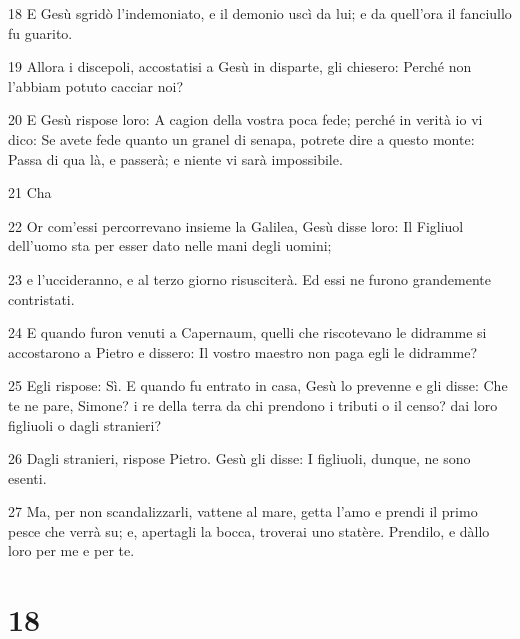 \par 18 E Gesù sgridò l'indemoniato, e il demonio uscì da lui; e da quell'ora il fanciullo fu guarito.
\par 19 Allora i discepoli, accostatisi a Gesù in disparte, gli chiesero: Perché non l'abbiam potuto cacciar noi?
\par 20 E Gesù rispose loro: A cagion della vostra poca fede; perché in verità io vi dico: Se avete fede quanto un granel di senapa, potrete dire a questo monte: Passa di qua là, e passerà; e niente vi sarà impossibile.
\par 21 Cha
\par 22 Or com'essi percorrevano insieme la Galilea, Gesù disse loro: Il Figliuol dell'uomo sta per esser dato nelle mani degli uomini;
\par 23 e l'uccideranno, e al terzo giorno risusciterà. Ed essi ne furono grandemente contristati.
\par 24 E quando furon venuti a Capernaum, quelli che riscotevano le didramme si accostarono a Pietro e dissero: Il vostro maestro non paga egli le didramme?
\par 25 Egli rispose: Sì. E quando fu entrato in casa, Gesù lo prevenne e gli disse: Che te ne pare, Simone? i re della terra da chi prendono i tributi o il censo? dai loro figliuoli o dagli stranieri?
\par 26 Dagli stranieri, rispose Pietro. Gesù gli disse: I figliuoli, dunque, ne sono esenti.
\par 27 Ma, per non scandalizzarli, vattene al mare, getta l'amo e prendi il primo pesce che verrà su; e, apertagli la bocca, troverai uno statère. Prendilo, e dàllo loro per me e per te.

\chapter{18}

